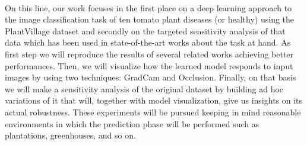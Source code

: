\\On this line, our work focuses in the first place on a deep learning approach to the image classification task of ten tomato plant diseases (or healthy) using the PlantVillage dataset and secondly on the targeted sensitivity analysis of that data which has been used in state-of-the-art works about the task at hand. As first step we will reproduce the results of several related works achieving better performances. Then, we will visualize how the learned model responds to input images by using two techniques: GradCam and Occlusion. Finally, on that basis we will make a sensitivity analysis of the original dataset by building ad hoc variations of it that will, together with model visualization, give us insights on its actual robustness. These experiments will be pursued keeping in mind reasonable environments in which the prediction phase will be performed such as plantations, greenhouses, and so on.








